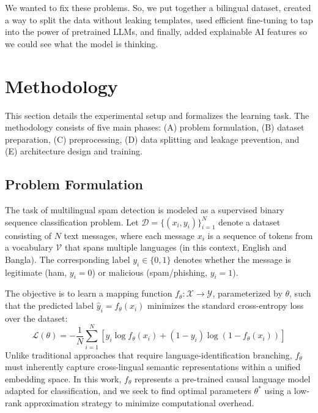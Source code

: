\documentclass[journal]{IEEEtran}
\begin{document}
We wanted to fix these problems. So, we put together a bilingual dataset, created a way to split the data without leaking templates, used efficient fine-tuning to tap into the power of pretrained LLMs, and finally, added explainable AI features so we could see what the model is thinking.



\section{Methodology}

This section details the experimental setup and formalizes the learning task. The methodology consists of five main phases: (A) problem formulation, (B) dataset preparation, (C) preprocessing, (D) data splitting and leakage prevention, and (E) architecture design and training.

\subsection{Problem Formulation}

The task of multilingual spam detection is modeled as a supervised binary sequence classification problem. Let $\mathcal{D} = \{(x_i, y_i)\}_{i=1}^{N}$ denote a dataset consisting of $N$ text messages, where each message $x_i$ is a sequence of tokens from a vocabulary $\mathcal{V}$ that spans multiple languages (in this context, English and Bangla). The corresponding label $y_i \in \{0, 1\}$ denotes whether the message is legitimate (ham, $y_i = 0$) or malicious (spam/phishing, $y_i = 1$). 

The objective is to learn a mapping function $f_\theta: \mathcal{X} \rightarrow \mathcal{Y}$, parameterized by $\theta$, such that the predicted label $\hat{y}_i = f_\theta(x_i)$ minimizes the standard cross-entropy loss over the dataset:
\begin{equation}
\mathcal{L}(\theta) = -\frac{1}{N} \sum_{i=1}^{N} \left[ y_i \log f_\theta(x_i) + (1 - y_i) \log (1 - f_\theta(x_i)) \right]
\end{equation}
Unlike traditional approaches that require language-identification branching, $f_\theta$ must inherently capture cross-lingual semantic representations within a unified embedding space. In this work, $f_\theta$ represents a pre-trained causal language model adapted for classification, and we seek to find optimal parameters $\theta^*$ using a low-rank approximation strategy to minimize computational overhead.
\end{document}
